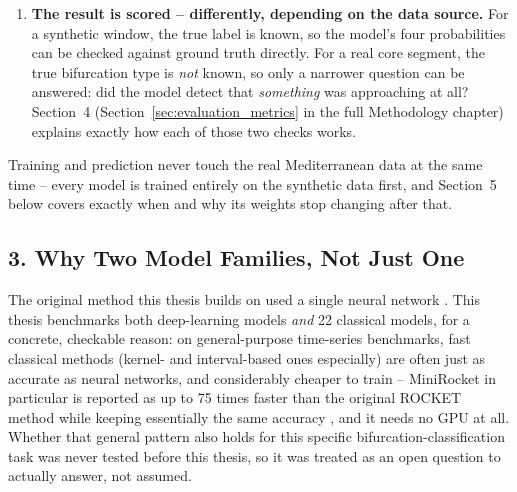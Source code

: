 \begin{enumerate}
    exposes the same \texttt{predict\_proba()} function, so the rest of
    the code never has to know or care which kind of model it is talking
    to. For a neural network, this is a standard softmax turning the
    network's raw output into four probabilities that add up to 1. For
    most of the classical models it is just that model's own built-in
    probability output. For one specific family of classical models (the
    ROCKET family, which only produce a raw decision score rather than a
    probability), the code applies the same softmax conversion by hand.
    Either way, the result leaving this step always looks the same: four
    probabilities, one per class.
    \item \textbf{The result is scored -- differently, depending on the
    data source.} For a synthetic window, the true label is known, so
    the model's four probabilities can be checked against ground truth
    directly. For a real core segment, the true bifurcation type is
    \emph{not} known, so only a narrower question can be answered: did
    the model detect that \emph{something} was approaching at all?
    Section~4 (Section~\ref{sec:evaluation_metrics} in the full
    Methodology chapter) explains exactly how each of those two checks
    works.
\end{enumerate}

Training and prediction never touch the real Mediterranean data at the
same time -- every model is trained entirely on the synthetic data first,
and Section~5 below covers exactly when and why its weights stop
changing after that.

\subsection*{3. Why Two Model Families, Not Just One}

The original method this thesis builds on used a single neural network
\citep{bury2021}. This thesis benchmarks both deep-learning models
\emph{and} 22 classical models, for a concrete, checkable reason: on
general-purpose time-series benchmarks, fast classical methods (kernel-
and interval-based ones especially) are often just as accurate as neural
networks, and considerably cheaper to train -- MiniRocket in particular
is reported as up to 75 times faster than the original ROCKET method
while keeping essentially the same accuracy \citep{dempster2021minirocket},
and it needs no GPU at all. Whether that general pattern also holds for
this specific bifurcation-classification task was never tested before
this thesis, so it was treated as an open question to actually answer,
not assumed.


